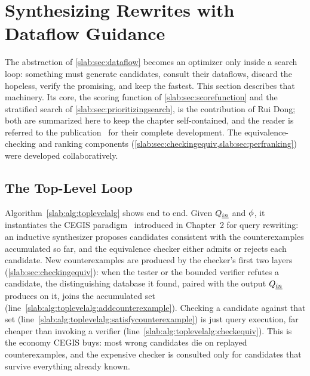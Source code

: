 \section{Synthesizing Rewrites with Dataflow Guidance}
\label{slab:sec:synthesis}
\label{slab:sec:alg}

The abstraction of \cref{slab:sec:dataflow} becomes an optimizer only
inside a search loop: something must generate candidates, consult
their dataflows, discard the hopeless, verify the promising, and keep
the fastest. This section describes that machinery. Its core, the
scoring function of \cref{slab:sec:scorefunction} and the stratified
search of \cref{slab:sec:prioritizingsearch}, is the contribution of
Rui Dong; both are summarized here to keep the chapter self-contained,
and the reader is referred to the publication~\cite{dong2023slabcity}
for their complete development. The equivalence-checking and ranking
components (\cref{slab:sec:checkingequiv,slab:sec:perfranking}) were
developed collaboratively.

\subsection{The Top-Level Loop}
\label{slab:sec:toplevelalg}

Algorithm~\ref{slab:alg:toplevelalg} shows \toolname end to end. Given
$Q_{\emph{in}}$ and $\phi$, it instantiates the CEGIS
paradigm~\cite{solar2008program} introduced in Chapter~2 for query
rewriting: an inductive synthesizer proposes candidates consistent
with the counterexamples accumulated so far, and the equivalence
checker either admits or rejects each candidate. New counterexamples
are produced by the checker's first two layers
(\cref{slab:sec:checkingequiv}): when the tester or the bounded
verifier refutes a candidate, the distinguishing database it found,
paired with the output $Q_{\emph{in}}$ produces on it, joins the
accumulated set (line~\ref{slab:alg:toplevelalg:addcounterexample}).
Checking a candidate against that set
(line~\ref{slab:alg:toplevelalg:satisfycounterexample}) is just query
execution, far cheaper than invoking a verifier
(line~\ref{slab:alg:toplevelalg:checkequiv}). This is the economy
CEGIS buys: most wrong candidates die on replayed counterexamples, and
the expensive checker is consulted only for candidates that survive
everything already known.

